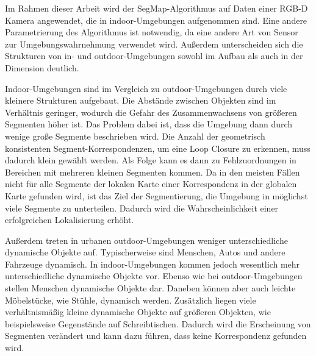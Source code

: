 Im Rahmen dieser Arbeit wird der SegMap-Algorithmus auf Daten einer RGB-D Kamera angewendet, die in indoor-Umgebungen aufgenommen sind. Eine andere Parametrierung des Algorithmus ist notwendig, da eine andere Art von Sensor zur Umgebungswahrnehmung verwendet wird. Außerdem unterscheiden sich die Strukturen von in- und outdoor-Umgebungen sowohl im Aufbau als auch in der Dimension deutlich. 

Indoor-Umgebungen sind im Vergleich zu outdoor-Umgebungen durch viele kleinere Strukturen aufgebaut. Die Abstände zwischen Objekten sind im Verhältnis geringer, wodurch die Gefahr des Zusammenwachsens von größeren Segmenten höher ist. Das Problem dabei ist, dass die Umgebung dann durch wenige große Segmente beschrieben wird. Die Anzahl der geometrisch konsistenten Segment-Korrespondenzen, um eine Loop Closure zu erkennen, muss dadurch klein gewählt werden. Als Folge kann es dann zu Fehlzuordnungen in Bereichen mit mehreren kleinen Segmenten kommen. Da in den meisten Fällen nicht für alle Segmente der lokalen Karte einer Korrespondenz in der globalen Karte gefunden wird, ist das Ziel der Segmentierung, die Umgebung in möglichst viele Segmente zu unterteilen. Dadurch wird die Wahrscheinlichkeit einer erfolgreichen Lokalisierung erhöht. 

Außerdem treten in urbanen outdoor-Umgebungen weniger unterschiedliche dynamische Objekte auf. Typischerweise sind Menschen, Autos und andere Fahrzeuge dynamisch. In indoor-Umgebungen kommen jedoch wesentlich mehr unterschiedliche dynamische Objekte vor. Ebenso wie bei outdoor-Umgebungen stellen Menschen dynamische Objekte dar. Daneben können aber auch leichte Möbelstücke, wie Stühle, dynamisch werden. Zusätzlich liegen viele verhältnismäßig kleine dynamische Objekte auf größeren Objekten, wie beispielsweise Gegenstände auf Schreibtischen. Dadurch wird die Erscheinung von Segmenten verändert und kann dazu führen, dass keine Korrespondenz gefunden wird.  

%
%

